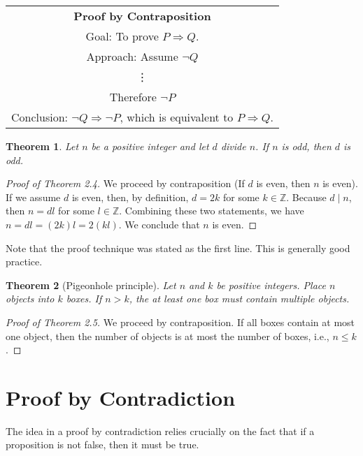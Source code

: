 \documentclass[12pt,a4paper]{article}
\newtheorem{theorem}{Theorem}[section]
\theoremstyle{definition}
\begin{document}
\begin{center}
\begin{tabular}{|c|}
\hline 
\textbf{Proof by Contraposition} \\ 
Goal: To prove $P\Rightarrow Q$. \\ 
Approach: Assume $\neg Q$ \\ 
\vdots \\ 
Therefore $\neg P$ \\ 
Conclusion: $\neg Q\Rightarrow\neg P$, which is equivalent to $P\Rightarrow Q$. \\ 
\hline 
\end{tabular} 
\end{center}

\begin{theorem}\label{thm2.4}
Let $n$ be a positive integer and let $d$ divide $n$. If $n$ is odd, then $d$ is odd.
\end{theorem}

\begin{proof}[Proof of Theorem 2.4]
We proceed by contraposition (If $d$ is even, then $n$ is even). If we assume $d$ is even, then, by definition, $d=2k$ for some $k\in\mathbb{Z}$. Because $d\mid n$, then $n=dl$ for some $l\in\mathbb{Z}$. Combining these two statements, we have $n=dl=(2k)l=2(kl)$. We conclude that $n$ is even.
\end{proof}

Note that the proof technique was stated as the first line. This is generally good practice.

\begin{theorem}[Pigeonhole principle]\label{thm2.5}
Let $n$ and $k$ be positive integers. Place $n$ objects into $k$ boxes. If $n>k$, the at least one box must contain multiple objects.
\end{theorem}

\begin{proof}[Proof of Theorem 2.5]
We proceed by contraposition. If all boxes contain at most one object, then the number of objects is at most the number of boxes, i.e., $n\leq k$.
\end{proof}

\section*{Proof by Contradiction}
The idea in a proof by contradiction relies crucially on the fact that if a proposition is not false, then it must be true.
\end{document}
